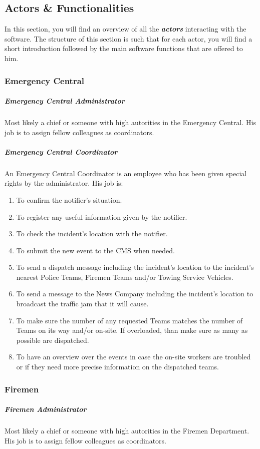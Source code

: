 \subsection{Actors \& Functionalities}
In this section, you will find an overview of all the
\textbf{\emph{\glspl{actor}}} interacting with the software. The structure of
this section is such that for each actor, you will find a short introduction
followed by the main software functions that are offered to him.

\subsubsection{Emergency Central}
\subparagraph{Emergency Central Administrator}
Most likely a chief or someone with high autorities in the Emergency Central. His
job is to assign fellow colleagues as coordinators.

\subparagraph{Emergency Central Coordinator}
An Emergency Central Coordinator is an employee who has been given special rights
by the administrator. His job is:

\begin{enumerate}
\item To confirm the notifier's situation.
\item To register any useful information given by the notifier.
\item To check the incident's location with the notifier.
\item To submit the new event to the CMS when needed.
\item To send a dispatch message including the incident's location to the
incident's nearest Police Teams, Firemen Teams and/or Towing Service Vehicles.
\item To send a message to the News Company including the incident's location to
broadcast the traffic jam that it will cause.
\item To make sure the number of any requested Teams matches the number of Teams
on its way and/or on-site. If overloaded, than make sure as many as possible are
dispatched.
\item To have an overview over the events in case the on-site workers are
troubled or if they need more precise information on the dispatched teams.
\end{enumerate}



\subsubsection{Firemen}
\subparagraph{Firemen Administrator}
Most likely a chief or someone with high autorities in the Firemen Department.
His job is to assign fellow colleagues as coordinators.

